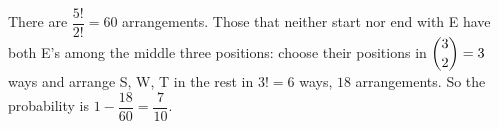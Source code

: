 There are $\dfrac{5!}{2!}=60$ arrangements. Those that neither start nor end with E have both E's among the middle three positions: choose their positions in $\dbinom32=3$ ways and arrange S, W, T in the rest in $3!=6$ ways, $18$ arrangements. So the probability is $1-\dfrac{18}{60}=\boxed{\dfrac{7}{10}}$.
